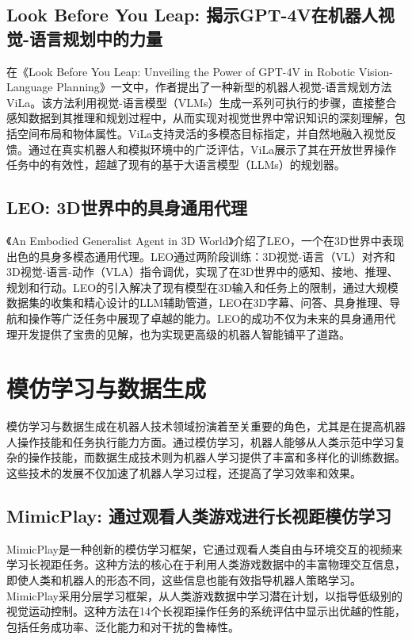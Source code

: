 \documentclass[a4paper]{article}
\begin{document}
\subsection{Look Before You Leap: 揭示GPT-4V在机器人视觉-语言规划中的力量}
在《Look Before You Leap: Unveiling the Power of GPT-4V in Robotic Vision-Language Planning》一文中，作者提出了一种新型的机器人视觉-语言规划方法ViLa。该方法利用视觉-语言模型（VLMs）生成一系列可执行的步骤，直接整合感知数据到其推理和规划过程中，从而实现对视觉世界中常识知识的深刻理解，包括空间布局和物体属性。ViLa支持灵活的多模态目标指定，并自然地融入视觉反馈。通过在真实机器人和模拟环境中的广泛评估，ViLa展示了其在开放世界操作任务中的有效性，超越了现有的基于大语言模型（LLMs）的规划器。

\subsection{LEO: 3D世界中的具身通用代理}
《An Embodied Generalist Agent in 3D World》介绍了LEO，一个在3D世界中表现出色的具身多模态通用代理。LEO通过两阶段训练：3D视觉-语言（VL）对齐和3D视觉-语言-动作（VLA）指令调优，实现了在3D世界中的感知、接地、推理、规划和行动。LEO的引入解决了现有模型在3D输入和任务上的限制，通过大规模数据集的收集和精心设计的LLM辅助管道，LEO在3D字幕、问答、具身推理、导航和操作等广泛任务中展现了卓越的能力。LEO的成功不仅为未来的具身通用代理开发提供了宝贵的见解，也为实现更高级的机器人智能铺平了道路。

\section{模仿学习与数据生成}
模仿学习与数据生成在机器人技术领域扮演着至关重要的角色，尤其是在提高机器人操作技能和任务执行能力方面。通过模仿学习，机器人能够从人类示范中学习复杂的操作技能，而数据生成技术则为机器人学习提供了丰富和多样化的训练数据。这些技术的发展不仅加速了机器人学习过程，还提高了学习效率和效果。

\subsection{MimicPlay: 通过观看人类游戏进行长视距模仿学习}
MimicPlay是一种创新的模仿学习框架，它通过观看人类自由与环境交互的视频来学习长视距任务。这种方法的核心在于利用人类游戏数据中的丰富物理交互信息，即使人类和机器人的形态不同，这些信息也能有效指导机器人策略学习。MimicPlay采用分层学习框架，从人类游戏数据中学习潜在计划，以指导低级别的视觉运动控制。这种方法在14个长视距操作任务的系统评估中显示出优越的性能，包括任务成功率、泛化能力和对干扰的鲁棒性。
\end{document}
